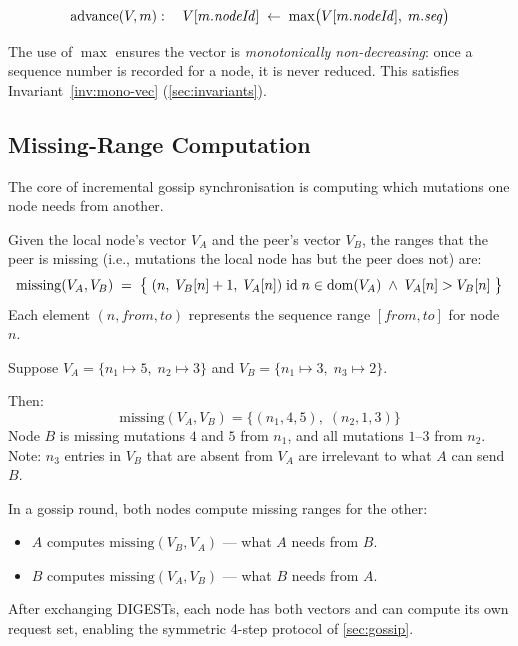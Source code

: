\begin{definition}
\[
  \mathrm{advance}(V, m) : \quad V[m.\mathit{nodeId}] \;\leftarrow\; \max\bigl(V[m.\mathit{nodeId}],\; m.\mathit{seq}\bigr)
\]
\end{definition}

The use of $\max$ ensures the vector is \emph{monotonically non-decreasing}: once
a sequence number is recorded for a node, it is never reduced. This satisfies
Invariant~\ref{inv:mono-vec} (\cref{sec:invariants}).

\subsection{Missing-Range Computation}

The core of incremental gossip synchronisation is computing which mutations one
node needs from another.

\begin{definition}
\label{def:missing-ranges}
Given the local node's vector $V_A$ and the peer's vector $V_B$, the ranges
that the peer is missing (i.e., mutations the local node has but the peer does not)
are:
\[
  \mathrm{missing}(V_A, V_B) \;=\;
  \bigl\{\; (n,\; V_B[n]+1,\; V_A[n])
  \;\mathrm{id}\; n \in \mathrm{dom}(V_A) \;\land\; V_A[n] > V_B[n] \;\bigr\}
\]
Each element $(n, \mathit{from}, \mathit{to})$ represents the sequence range
$[\mathit{from}, \mathit{to}]$ for node $n$.
\end{definition}

\begin{example}
Suppose $V_A = \{n_1 \mapsto 5,\; n_2 \mapsto 3\}$ and
$V_B = \{n_1 \mapsto 3,\; n_3 \mapsto 2\}$.

Then:
\[
  \mathrm{missing}(V_A, V_B) = \{(n_1, 4, 5),\; (n_2, 1, 3)\}
\]
Node $B$ is missing mutations $4$ and $5$ from $n_1$, and all mutations $1$--$3$
from $n_2$. Note: $n_3$ entries in $V_B$ that are absent from $V_A$ are irrelevant
to what $A$ can send $B$.
\end{example}

\begin{remark}
In a gossip round, both nodes compute missing ranges for the other:
\begin{itemize}[leftmargin=1.5em]
  \item $A$ computes $\mathrm{missing}(V_B, V_A)$ --- what $A$ needs from $B$.
  \item $B$ computes $\mathrm{missing}(V_A, V_B)$ --- what $B$ needs from $A$.
\end{itemize}
After exchanging DIGESTs, each node has both vectors and can compute its own
request set, enabling the symmetric 4-step protocol of \cref{sec:gossip}.
\end{remark}

